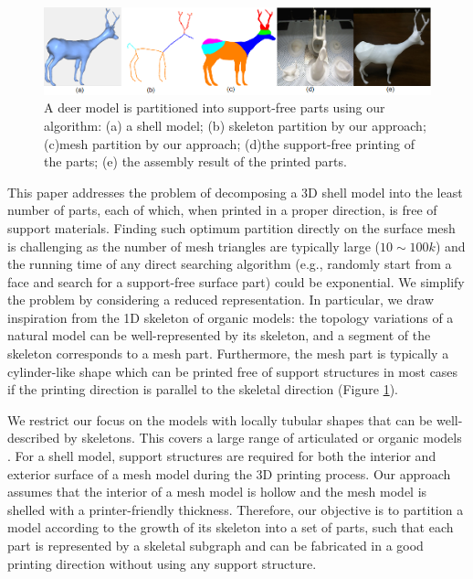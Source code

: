 \begin{figure}[t]
  \centering
  \includegraphics[width=\linewidth]{figs/tree_with_skeleton.png}
  \caption{\label{fig:ex1}%
  A deer model is partitioned into support-free parts using our algorithm: (a) a shell model; (b) skeleton partition by our approach; (c)mesh partition by our approach; (d)the support-free printing of the parts; (e) the assembly result of the printed parts.}
\end{figure}


This paper addresses the problem of decomposing a 3{D} {\color{blue} shell model} into the least number of parts, each of which, when printed in a proper direction, is free of support materials. {Finding such optimum partition directly on the surface mesh is challenging as the number of mesh triangles are typically large ($10\sim100k$) and {\color{blue}the running time of any direct searching algorithm (e.g., randomly start from a face and search for a support-free surface part) could be exponential}. We simplify the problem by considering a reduced representation. In particular,} we draw inspiration from the 1{D} skeleton of organic models: the topology variations of a natural model can be well-represented by its skeleton, and a {segment} of the skeleton corresponds to a mesh part. Furthermore, the mesh part is typically a cylinder-like shape which can be printed free of support structures in most cases if the printing direction is parallel to the skeletal direction (Figure \ref{fig:ex1}).

{\color{blue} We restrict our focus on {the models with locally tubular shapes that} can be well-described by skeletons. This covers a large range of articulated or organic models \cite{tagliasacchi2009curve}}. {{For a shell model}}, support structures are required for both the interior and exterior surface of a mesh model during the 3{D} printing process. Our approach assumes that the interior of a mesh model is hollow and the mesh model is shelled with a printer-friendly thickness. Therefore, our objective is to partition a model according to the growth of its skeleton into a set of parts, such that each part is represented by a skeletal subgraph and can be fabricated in a good printing direction without using any support structure. %


